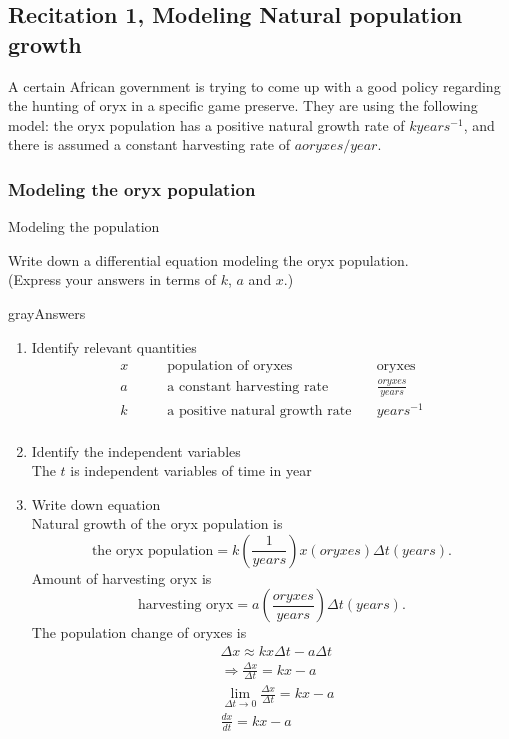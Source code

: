 \subsection{Recitation 1, Modeling Natural population growth}
A certain African government is trying to come up with a good policy regarding
the hunting of oryx in a specific game preserve.
They are using the following model: the oryx population has a positive natural growth rate of
$k years^{-1}$, and there is assumed a constant harvesting rate of $a oryxes/year$.
\subsubsection{Modeling the oryx population}
\begin{problem}
  Modeling the population
\end{problem}
Write down a differential equation modeling the oryx population.\\
(Express your answers in terms of $k$, $a$ and $x$.)
\begin{mybox}{gray}{Answers}
  \begin{enumerate}
  \item Identify relevant quantities\\
    \begin{align*}
      \displaystyle x &\qquad \text{population of oryxes} &\quad  \text{oryxes} \\
      \displaystyle a &\qquad \text{a constant harvesting rate} &\quad  \frac{oryxes}{years} \\
      \displaystyle k &\qquad \text{a positive natural growth rate} &\quad  years^{-1}\\
    \end{align*}
  \item Identify the independent variables\\
    The $t$ is independent variables of time in year 
  \item Write down equation\\
    Natural growth of the oryx population is
    \begin{equation*}
      \displaystyle \text{the oryx population} = k(\frac{1}{years}) x(oryxes) \Delta t(years). 
    \end{equation*}
    Amount of harvesting oryx is
    \begin{equation*}
      \displaystyle \text{harvesting oryx} = a(\frac{oryxes}{years}) \Delta t(years).
    \end{equation*}
    The population change of oryxes is
    \begin{align*}
      &\displaystyle \Delta x \approx kx \Delta t - a \Delta t \\
      &\displaystyle \Rightarrow \frac{\Delta x}{\Delta t} = kx - a\\
      &\displaystyle \lim \limits _{\Delta t\rightarrow 0}\frac{\Delta x}{\Delta t} = kx - a\\
      &\displaystyle \frac{dx}{dt} = kx - a
    \end{align*}
  \end{enumerate}
\end{mybox}
